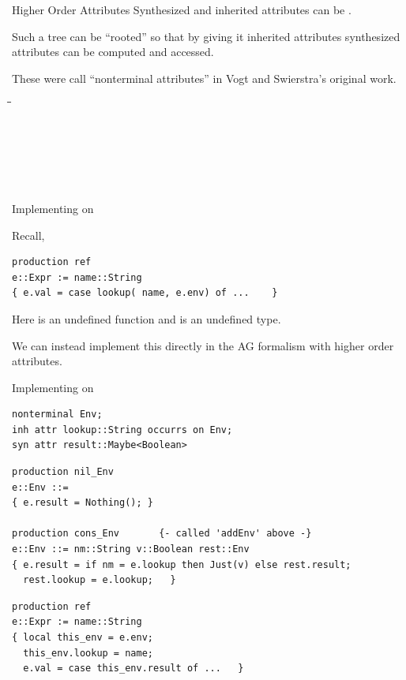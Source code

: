 \documentclass[notes,11pt,aspectratio=169]{beamer}
\begin{document}
\begin{frame}{Higher Order Attributes}
\biA
 \x Synthesized and inherited attributes can be .

 \x Such a tree can be ``rooted'' so that
  \bi
   \x by giving it inherited attributes
   \x synthesized attributes can be computed and accessed.
  \ei

 \x These were call ``nonterminal attributes'' in Vogt and Swierstra's
    original work.

   \begin{tabbing}
    \=\=\=\kill
     \\
     \\
    \code{\ttlbrace{}} \\
    \> \\
    \> \\
    \> \\
    \code{\ttrbrace{}} 
    \end{tabbing}

\ei
\end{frame}

\begin{frame}[fragile]{Implementing  on }


Recall,
\begin{verbatim}
production ref
e::Expr := name::String
{ e.val = case lookup( name, e.env) of ...    }
\end{verbatim}

\bigskip
Here  is an undefined function and
%
 is an undefined type.

\pause
\bigskip
We can instead implement this directly in the AG formalism with higher
order attributes.
\end{frame}

\begin{frame}[fragile]{Implementing  on }
\small
\begin{verbatim}
nonterminal Env;
inh attr lookup::String occurrs on Env;
syn attr result::Maybe<Boolean>
\end{verbatim}

\pause
\begin{verbatim}
production nil_Env
e::Env ::=
{ e.result = Nothing(); }

production cons_Env       {- called 'addEnv' above -}
e::Env ::= nm::String v::Boolean rest::Env
{ e.result = if nm = e.lookup then Just(v) else rest.result;
  rest.lookup = e.lookup;   }
\end{verbatim}

\pause
\begin{verbatim}
production ref
e::Expr := name::String
{ local this_env = e.env;
  this_env.lookup = name;
  e.val = case this_env.result of ...   }
\end{verbatim}

\end{frame}
\end{document}
